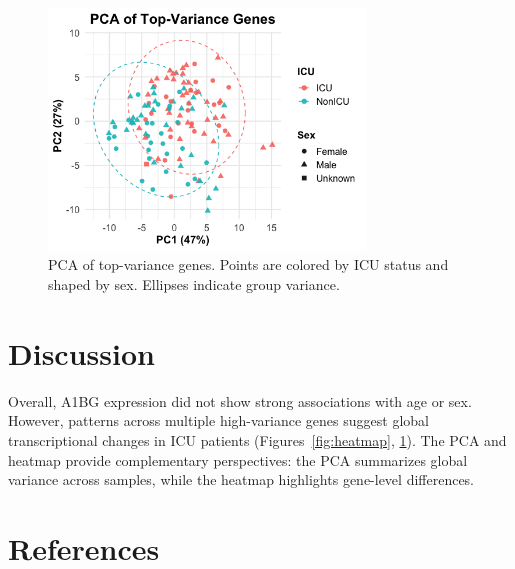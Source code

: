 \documentclass[11pt]{article}
\begin{document}
\begin{figure}[H]
\centering
\includegraphics[width=0.75\textwidth]{fig5_pca.png}
\caption{PCA of top-variance genes. Points are colored by ICU status and shaped by sex. Ellipses indicate group variance.}
\label{fig:pca}
\end{figure}

\section{Discussion}
Overall, A1BG expression did not show strong associations with age or sex. 
However, patterns across multiple high-variance genes suggest global transcriptional changes in ICU patients (Figures~\ref{fig:heatmap}, \ref{fig:pca}). 
The PCA and heatmap provide complementary perspectives: the PCA summarizes global variance across samples, while the heatmap highlights gene-level differences.

\section{References}


\end{document}

